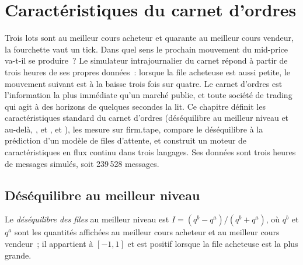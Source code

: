 \chapter{Caractéristiques du carnet d'ordres}\label{ch:rs:order-book-features}

Trois lots sont au meilleur cours acheteur et quarante au meilleur cours vendeur, la fourchette vaut un tick. Dans quel sens le prochain mouvement du mid-price va-t-il
se produire~? Le simulateur intrajournalier du carnet répond à partir de trois heures de ses propres données~: lorsque la file acheteuse est aussi petite, le mouvement suivant
est à la baisse trois fois sur quatre. Le carnet d'ordres est l'information la plus immédiate qu'un marché publie, et toute société de trading
qui agit à des horizons de quelques secondes la lit. Ce chapitre définit les caractéristiques standard du carnet d'ordres (déséquilibre au meilleur niveau et
au-delà, ,  et ,  et ), les mesure sur
firm.tape, compare le déséquilibre à la prédiction d'un modèle de files d'attente, et construit un moteur de caractéristiques en flux continu dans trois
langages. Ses données sont trois heures de messages simulés, soit 239\,528 messages.

\section{Déséquilibre au meilleur niveau}

\begin{definition}\label{def:rs:order-book-features:imbalance}
Le \emph{déséquilibre des files} au meilleur niveau est $I = (q^b - q^a)/(q^b + q^a)$, où $q^b$ et $q^a$ sont les
quantités affichées au meilleur cours acheteur et au meilleur cours vendeur~; il appartient à $[-1, 1]$ et est positif lorsque la file acheteuse est la plus grande.
\end{definition}

